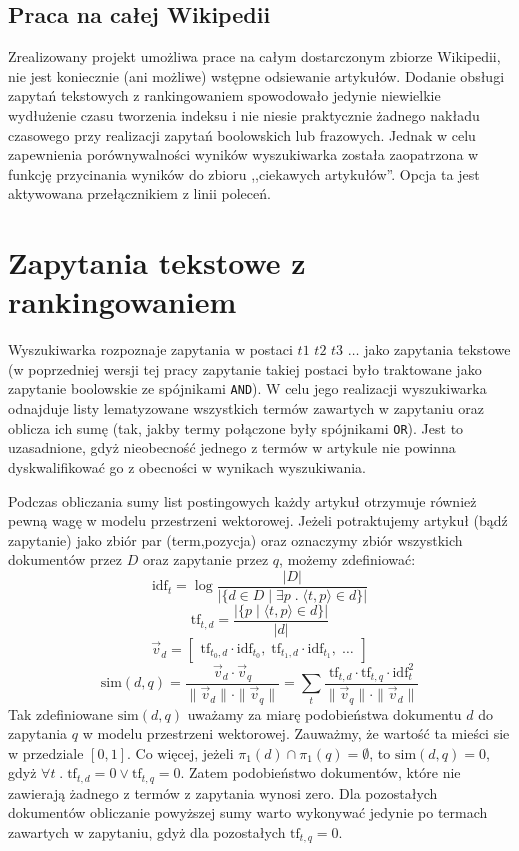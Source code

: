\documentclass[a4paper,12pt]{article}
\begin{document}
\subsection{Praca na całej Wikipedii}
Zrealizowany projekt umożliwa prace na całym dostarczonym zbiorze Wikipedii,
nie jest koniecznie (ani możliwe) wstępne odsiewanie artykułów. Dodanie obsługi
zapytań tekstowych z rankingowaniem spowodowało jedynie niewielkie wydłużenie
czasu tworzenia indeksu i nie niesie praktycznie żadnego nakładu czasowego przy
realizacji zapytań boolowskich lub frazowych. Jednak w celu zapewnienia
porównywalności wyników wyszukiwarka została zaopatrzona w funkcję przycinania
wyników do zbioru ,,ciekawych artykułów''. Opcja ta jest aktywowana
przełącznikiem z linii poleceń.

\section{Zapytania tekstowe z rankingowaniem}
Wyszukiwarka rozpoznaje zapytania w postaci $t1$ $t2$ $t3$ $\dots$ jako
zapytania tekstowe (w poprzedniej wersji tej pracy zapytanie takiej postaci było
traktowane jako zapytanie boolowskie ze spójnikami \texttt{AND}). W celu jego
realizacji wyszukiwarka odnajduje listy lematyzowane wszystkich termów zawartych
w zapytaniu oraz oblicza ich sumę (tak, jakby termy połączone były spójnikami
\texttt{OR}). Jest to uzasadnione, gdyż nieobecność jednego z termów w artykule
nie powinna dyskwalifikować go z obecności w wynikach wyszukiwania.

Podczas obliczania sumy list postingowych każdy artykuł otrzymuje również
pewną wagę w modelu przestrzeni wektorowej. Jeżeli potraktujemy artykuł (bądź
zapytanie) jako zbiór par (term,pozycja) oraz oznaczymy zbiór wszystkich
dokumentów przez $D$ oraz zapytanie przez $q$, możemy zdefiniować:
\newcommand{\simi}[2]{\mathrm{sim}(#1,#2)}
\newcommand{\idf}[1]{\mathrm{idf}_{#1}}
\newcommand{\tf}[2]{\mathrm{tf}_{#1,#2}}
\[ \idf{t} = \log \frac{ |D| }{ |\{d \in D \mid \exists p \;.\; \langle t,p \rangle \in d\}| } \]
\[ \tf{t}{d} = \frac{ |\{ p \mid \langle t,p \rangle \in d\}| }{ |d| } \]
\[ \vec v_d = \begin{bmatrix} \tf{t_0}{d} \cdot \idf{t_0},\;
                \tf{t_1}{d} \cdot \idf{t_1},\;
                \dots \end{bmatrix} \]
\[ \simi{d}{q} =
      \frac{ \vec v_d \cdot \vec v_q }{ \|\vec v_d\| \cdot \|\vec v_q\| } =
      \sum_t \frac{ \tf{t}{d} \cdot \tf{t}{q} \cdot \idf{t}^2 }{ \|\vec v_q\| \cdot \|\vec v_d\| } \]
Tak zdefiniowane $\simi{d}{q}$ uważamy za miarę podobieństwa dokumentu $d$
do zapytania $q$ w modelu przestrzeni wektorowej. Zauważmy, że wartość ta mieści
sie w przedziale $[0, 1]$. Co więcej, jeżeli $\pi_1(d) \cap \pi_1(q) = \emptyset$,
to $\simi{d}{q} = 0$, gdyż $\forall t \;.\; \tf{t}{d} = 0 \vee \tf{t}{q} = 0$.
Zatem podobieństwo dokumentów, które nie zawierają żadnego z termów z zapytania
wynosi zero. Dla pozostałych dokumentów obliczanie powyższej sumy warto wykonywać
jedynie po termach zawartych w zapytaniu, gdyż dla pozostałych $\tf{t}{q} = 0$.
\end{document}
